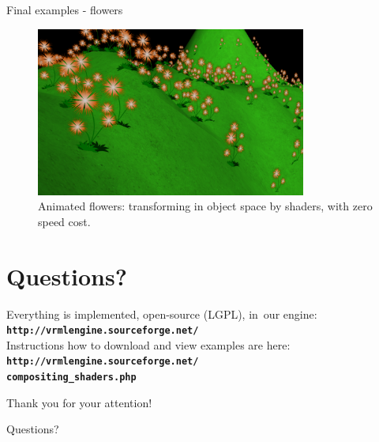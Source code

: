 \documentclass{beamer}
\begin{document}

\begin{frame}{Final examples - flowers}
\begin{figure}
  \centering
  \includegraphics[width=3.5in]{../flowers}
  \caption{Animated flowers: transforming in object space by shaders, with zero speed cost.}
\end{figure}
\end{frame}

\section{Questions?}

\begin{frame}[t]

\begin{center}
{\small
Everything is implemented, open-source (LGPL), in~our engine:\\
{\color{blue} \textbf{\texttt{http://vrmlengine.sourceforge.net/}}}\\
Instructions how to download and view examples are here:\\
{\color{blue} \textbf{\texttt{http://vrmlengine.sourceforge.net/\\
compositing\_shaders.php}}}}
\end{center}

\vspace{0.25in}

\begin{center}
{\Large Thank you for your attention!}
\end{center}


\begin{center}
{\Huge \alert{Questions?}}
\end{center}

\end{frame}
\end{document}
